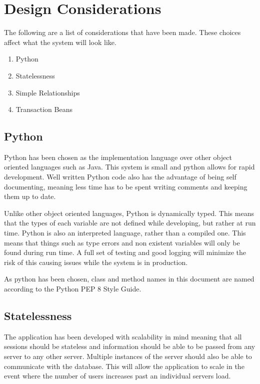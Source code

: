 \section{Design Considerations}

\par
The following are a list of considerations that have been made. These choices affect what the system will look like.

\begin{enumerate}
	\item Python
	\item Statelessness
	\item Simple Relationships
	\item Transaction Beans
\end{enumerate}

\subsection{Python}
\par
Python has been chosen as the implementation language over other object oriented languages such as Java. This system is small and python allows for rapid development. Well written Python code also has the advantage of being self documenting, meaning less time has to be spent writing comments and keeping them up to date.

\par
Unlike other object oriented languages, Python is dynamically typed. This means that the types of each variable are not defined while developing, but rather at run time. Python is also an interpreted language, rather than a compiled one. This means that things such as type errors and non existent variables will only be found during run time. A full set of testing and good logging will minimize the risk of this causing issues while the system is in production.

\par
As python has been chosen, class and method names in this document are named according to the Python PEP 8 Style Guide.


\subsection{Statelessness}
\par
The application has been developed with scalability in mind meaning that all sessions should be stateless and information should be able to be passed from any server to any other server. Multiple instances of the server should also be able to communicate with the database. This will allow the application to scale in the event where the number of users increases past an individual servers load.

